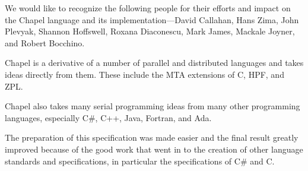 \label{Acknowledgments}

We would like to recognize the following people for their efforts and
impact on the Chapel language and its implementation---David Callahan,
Hans Zima, John Plevyak, Shannon Hoffswell, Roxana Diaconescu, Mark
James, Mackale Joyner, and Robert Bocchino.

Chapel is a derivative of a number of parallel and distributed
languages and takes ideas directly from them.  These include the MTA
extensions of C, HPF, and ZPL.

Chapel also takes many serial programming ideas from many other
programming languages, especially C\#, C++, Java, Fortran, and Ada.

The preparation of this specification was made easier and the final
result greatly improved because of the good work that went in to the
creation of other language standards and specifications, in particular
the specifications of C\# and C.
